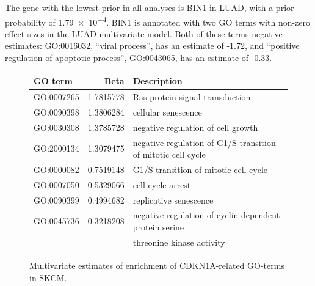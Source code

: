 

The gene with the lowest prior in all analyses is BIN1 in LUAD, with a prior probability of \num{1.79e-4}.  BIN1 is annotated with two GO terms with non-zero effect sizes in the LUAD multivariate model.  Both of these terms negative estimates: GO:0016032, ``viral process'', has an estimate of -1.72, and ``positive regulation of apoptotic process'', GO:0043065, has an estimate of -0.33.


\begin{figure}
    \centering
\begin{tabular}{l|r|l}
\hline
GO term & Beta & Description\\
\hline
GO:0007265 & 1.7815778 & Ras protein signal transduction\\
\hline
GO:0090398 & 1.3806284 & cellular senescence\\
\hline
GO:0030308 & 1.3785728 & negative regulation of cell growth\\
\hline
GO:2000134 & 1.3079475 & negative regulation of G1/S transition of mitotic cell cycle\\
\hline
GO:0000082 & 0.7519148 & G1/S transition of mitotic cell cycle\\
\hline
GO:0007050 & 0.5329066 & cell cycle arrest\\
\hline
GO:0090399 & 0.4994682 & replicative senescence\\
\hline
  GO:0045736 & 0.3218208 & negative regulation of cyclin-dependent protein serine \\
        & & threonine kinase activity\\
\hline
\end{tabular}\label{tab:CDKN1A_features}
\caption{Multivariate estimates of enrichment of CDKN1A-related GO-terms in SKCM.}
\end{figure}

